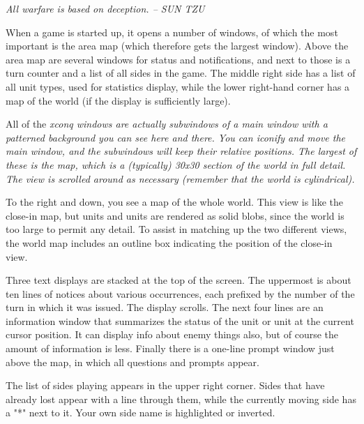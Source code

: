 

\par
\it
All warfare is based on deception.  -- SUN TZU
\rm
\par\noindent
When a game is started up, it opens a
number of windows, of which the most important is the area map (which
therefore gets the largest window).
Above the area map are several windows for status
and notifications, and next to those is a turn counter and a list of all
sides in the game. 
The middle right side has a list of all unit types, used for statistics
display, while the lower right-hand corner has a map of the world
(if the display is sufficiently large).
\par\noindent
All of the %
\it xconq \rm%
windows
are actually subwindows of a main window with
a patterned background you can see here and there.  You can iconify and move
the main window, and the subwindows will keep their relative positions.
The largest of these is the map, which is a (typically) 30x30 section of the
world in full detail.  The view is scrolled around as necessary (remember
that the world is cylindrical).
\par\noindent
To the right and down, you see a map of the whole world.  This view is like
the close-in map, but units and units are rendered as solid blobs, since
the world is too large to permit any detail.  To assist in matching up the
two different views, the world map includes an outline box indicating
the position of the close-in view.
\par\noindent
Three text displays are stacked at the top of the screen.  The uppermost
is about ten lines of notices about various occurrences, each prefixed
by the number of the turn in which it was issued.  The display scrolls.
The next four lines are an information window that summarizes the status of
the unit or unit at the current cursor position.  It can display info about
enemy things also, but of course the amount of information is less.
Finally there is a one-line
prompt window just above the map, in which all questions and prompts appear.
\par\noindent
The list of sides playing appears in the upper right corner.  Sides that have
already lost appear with a line through them,
while the currently moving side has a "*" next to it.
Your own side name is highlighted or inverted.
